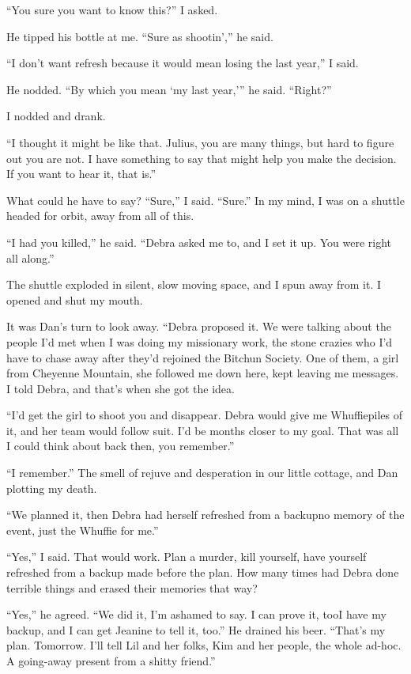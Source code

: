“You sure you want to know this?” I asked.

He tipped his bottle at me. “Sure as shootin',” he said.

“I don't want refresh because it would mean losing the last year,”
I said.

He nodded. “By which you mean ‘my last year,’” he said. “Right?”

I nodded and drank.

“I thought it might be like that. Julius, you are many things, but
hard to figure out you are not. I have something to say that might
help you make the decision. If you want to hear it, that is.”

What could he have to say? “Sure,” I said. “Sure.” In my mind, I
was on a shuttle headed for orbit, away from all of this.

“I had you killed,” he said. “Debra asked me to, and I set it up.
You were right all along.”

The shuttle exploded in silent, slow moving space, and I spun away
from it. I opened and shut my mouth.

It was Dan's turn to look away. “Debra proposed it. We were talking
about the people I'd met when I was doing my missionary work, the
stone crazies who I'd have to chase away after they'd rejoined the
Bitchun Society. One of them, a girl from Cheyenne Mountain, she
followed me down here, kept leaving me messages. I told Debra, and
that's when she got the idea.

“I'd get the girl to shoot you and disappear. Debra would give me
Whuffie{\dash}piles of it, and her team would follow suit. I'd be months
closer to my goal. That was all I could think about back then, you
remember.”

“I remember.” The smell of rejuve and desperation in our little
cottage, and Dan plotting my death.

“We planned it, then Debra had herself refreshed from a backup{\dash}no
memory of the event, just the Whuffie for me.”

“Yes,” I said. That would work. Plan a murder, kill yourself, have
yourself refreshed from a backup made before the plan. How many
times had Debra done terrible things and erased their memories that
way?

“Yes,” he agreed. “We did it, I'm ashamed to say. I can prove it,
too{\dash}I have my backup, and I can get Jeanine to tell it, too.” He
drained his beer. “That's my plan. Tomorrow. I'll tell Lil and her
folks, Kim and her people, the whole ad-hoc. A going-away present
from a shitty friend.”

